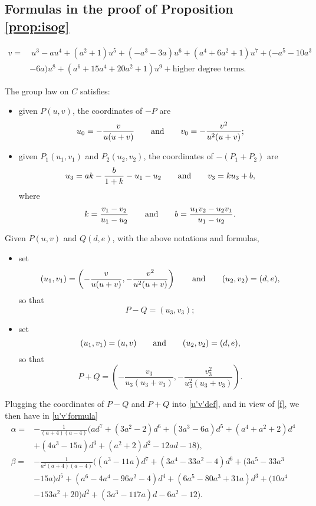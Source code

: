 \documentclass{gtpart}
\theoremstyle{definition}
\theoremstyle{remark}
\newcommand{\ad}{{\rm and}}
\newcommand{\A}{\alpha}
\begin{document}
\subsection{Formulas in the proof of Proposition \ref{prop:isog}}
\label{apx:isog}

\begin{equation*}
\begin{split}
 v = & ~ u^3 - a u^4 + (a^2 + 1) u^5 + (-a^3 - 3 a) u^6 + (a^4 + 6 a^2 + 1) u^7 + (-a^5 - 10 a^3 \\
     & - 6 a) u^8 + (a^6 + 15 a^4 + 20 a^2 + 1) u^9 + \text{higher degree terms}.  
\end{split}
\end{equation*}

The group law on $C$ satisfies: 
\begin{itemize}
 \item given $P(u,v)$, the coordinates of $-P$ are 
 \[
  u_0 = -\frac{v}{u (u + v)} \qquad \ad \qquad v_0 = -\frac{v^2}{u^2 (u + v)}; 
 \]

 \item given $P_1(u_1,v_1)$ and $P_2(u_2,v_2)$, the coordinates of $-(P_1 + P_2)$ are 
 \[
  u_3 = a k - \frac{b}{1 + k} - u_1 - u_2 \qquad \ad \qquad v_3 = k u_3 + b, 
 \]
 where 
 \[
  k = \frac{v_1 - v_2}{u_1 - u_2} \qquad \ad \qquad b = \frac{u_1 v_2 - u_2 v_1}{u_1 - u_2}.  
 \]
\end{itemize}
Given $P(u,v)$ and $Q(d,e)$, with the above notations and formulas, 
\begin{itemize}
 \item set 
 \[
  (u_1,v_1) = \left( -\frac{v}{u (u + v)},-\frac{v^2}{u^2 (u + v)} \right) \qquad \ad \qquad (u_2,v_2) = (d,e), 
 \]
 so that 
 \begin{equation}
 \label{P-Q}
  P - Q = (u_3,v_3); 
 \end{equation}

 \item set 
 \[
  (u_1,v_1) = (u,v) \qquad \ad \qquad (u_2,v_2) = (d,e), 
 \]
 so that 
 \begin{equation}
 \label{P+Q}
  P + Q = \left( -\frac{v_3}{u_3 (u_3 + v_3)},-\frac{v_3^2}{u_3^2 (u_3 + v_3)} \right).  
 \end{equation}
\end{itemize}
Plugging the coordinates of $P - Q$ and $P + Q$ into \eqref{u'v'def}, and in view of \eqref{f}, 
we then have in \eqref{u'v'formula} 
\begin{equation*}
\begin{split}
 \A = & -\frac{1}{(a + 4) (a - 4)} \big( a d^7 + (3 a^2 - 2) d^6 + (3 a^3 - 6 a) d^5 + (a^4 + a^2 + 2) d^4 \\
      & + (4 a^3 - 15 a) d^3 + (a^2 + 2) d^2 - 12 a d -18 \big), \\
 \beta = & -\frac{1}{a^2 (a + 4) (a - 4)} \big( (a^3 - 11 a) d^7 + (3 a^4 - 33 a^2 - 4) d^6 + (3 a^5 - 33 a^3 \\
         & - 15 a) d^5 + (a^6 - 4 a^4 - 96 a^2 - 4) d^4 + (6 a^5 - 80 a^3 + 31 a) d^3 + (10 a^4 \\
         & - 153 a^2 + 20) d^2 + (3 a^3 - 117 a) d - 6 a^2 - 12 \big).  
\end{split}
\end{equation*}
\end{document}
